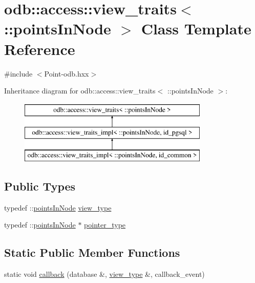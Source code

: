\hypertarget{classodb_1_1access_1_1view__traits_3_01_1_1points_in_node_01_4}{}\section{odb\+:\+:access\+:\+:view\+\_\+traits$<$ \+:\+:points\+In\+Node $>$ Class Template Reference}
\label{classodb_1_1access_1_1view__traits_3_01_1_1points_in_node_01_4}


{\ttfamily \#include $<$Point-\/odb.\+hxx$>$}

Inheritance diagram for odb\+:\+:access\+:\+:view\+\_\+traits$<$ \+:\+:points\+In\+Node $>$\+:\begin{figure}[H]
\begin{center}
\leavevmode
\includegraphics[height=3.000000cm]{d9/d9d/classodb_1_1access_1_1view__traits_3_01_1_1points_in_node_01_4}
\end{center}
\end{figure}
\subsection*{Public Types}
\begin{DoxyCompactItemize}
\item 
typedef \+::\hyperlink{structpoints_in_node}{points\+In\+Node} \hyperlink{classodb_1_1access_1_1view__traits_3_01_1_1points_in_node_01_4_ab9e8a9e1c7f74745131b794135c923b0}{view\+\_\+type}
\item 
typedef \+::\hyperlink{structpoints_in_node}{points\+In\+Node} $\ast$ \hyperlink{classodb_1_1access_1_1view__traits_3_01_1_1points_in_node_01_4_a3fa0e895cf70fe3d3be460293fe9fa97}{pointer\+\_\+type}
\end{DoxyCompactItemize}
\subsection*{Static Public Member Functions}
\begin{DoxyCompactItemize}
\item 
static void \hyperlink{classodb_1_1access_1_1view__traits_3_01_1_1points_in_node_01_4_ac00a3cbd5422e2e99b827f08fa6f163e}{callback} (database \&, \hyperlink{classodb_1_1access_1_1view__traits_3_01_1_1points_in_node_01_4_ab9e8a9e1c7f74745131b794135c923b0}{view\+\_\+type} \&, callback\+\_\+event)
\end{DoxyCompactItemize}


